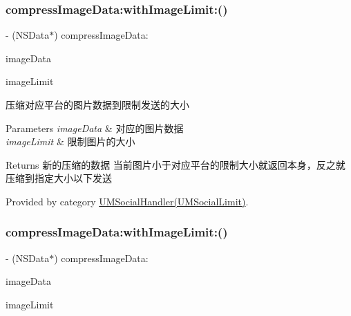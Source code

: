 \mbox{\label{interface_u_m_social_handler_a240f1107abc2ef1e2d139535551a4f36}} 
\subsubsection{\texorpdfstring{compress\+Image\+Data\+:with\+Image\+Limit\+:()}{compressImageData:withImageLimit:()}\hspace{0.1cm}{\footnotesize\ttfamily [1/2]}}
{\footnotesize\ttfamily -\/ (N\+S\+Data$\ast$) compress\+Image\+Data\+: \begin{DoxyParamCaption}\item[{(N\+S\+Data $\ast$)}]{image\+Data }\item[{withImageLimit:(N\+S\+U\+Integer)}]{image\+Limit }\end{DoxyParamCaption}}

压缩对应平台的图片数据到限制发送的大小


\begin{DoxyParams}{Parameters}
{\em image\+Data} & 对应的图片数据 \\
\hline
{\em image\+Limit} & 限制图片的大小\\
\hline
\end{DoxyParams}
\begin{DoxyReturn}{Returns}
新的压缩的数据  当前图片小于对应平台的限制大小就返回本身，反之就压缩到指定大小以下发送 
\end{DoxyReturn}


Provided by category \mbox{\hyperlink{category_u_m_social_handler_07_u_m_social_limit_08_a240f1107abc2ef1e2d139535551a4f36}{U\+M\+Social\+Handler(\+U\+M\+Social\+Limit)}}.

\mbox{\label{interface_u_m_social_handler_a240f1107abc2ef1e2d139535551a4f36}} 
\subsubsection{\texorpdfstring{compress\+Image\+Data\+:with\+Image\+Limit\+:()}{compressImageData:withImageLimit:()}\hspace{0.1cm}{\footnotesize\ttfamily [2/2]}}
{\footnotesize\ttfamily -\/ (N\+S\+Data$\ast$) compress\+Image\+Data\+: \begin{DoxyParamCaption}\item[{(N\+S\+Data $\ast$)}]{image\+Data }\item[{withImageLimit:(N\+S\+U\+Integer)}]{image\+Limit }\end{DoxyParamCaption}}

